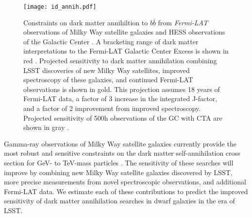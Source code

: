 \begin{figure}[t]
\centering
\texttt{[image: id\_annih.pdf]}
\caption{Constraints on dark matter annihiltion to $b\bar{b}$ from {\it Fermi-LAT} observations of Milky Way satellite galaxies \citep[LAT Dwarfs;][]{} and HESS observations of the Galactic Center \citep[HESS GC;][]{1607.08142}. 
A bracketing range of dark matter interpretations to the  Fermi-LAT Galactic Center Excess is shown in red \citep[GCE;][]{1402.6703, Gordon:2013, Abazajian:2014}.
Projected sensitivity to dark matter annihilation combining LSST discoveries of new Milky Way satellites, improved spectroscopy of these galaxies, and continued Fermi-LAT observations is shown in gold. This projection assumes 18 years of Fermi-LAT data, a factor of 3 increase in the integrated J-factor, and a factor of 2 improvement from improved spectroscopy. 
Projected sensitivity of 500h observations of the GC with CTA are shown in gray \citep[CTA GC;][]{Zaharijas:prep}.
\label{fig:indirect}
}
\end{figure}

Gamma-ray observations of Milky Way satellite galaxies currently provide the most robust and sensitive constraints on the dark matter self-annihilation cross section for GeV- to TeV-mass particles \citep[\eg][]{Ackermann:2014, Geringer-Sameth:2015, Ackermann:2015, 1812.06986}.
The sensitivity of these searches will improve by combining new Milky Way satellite galaxies discovered by LSST, more precise \Jfactor measurements from novel spectroscopic observations, and additional Fermi-LAT data. 
We estimate each of these contributions to predict the improved sensitivity of dark matter annihilation searches in dwarf galaxies in the era of LSST.

